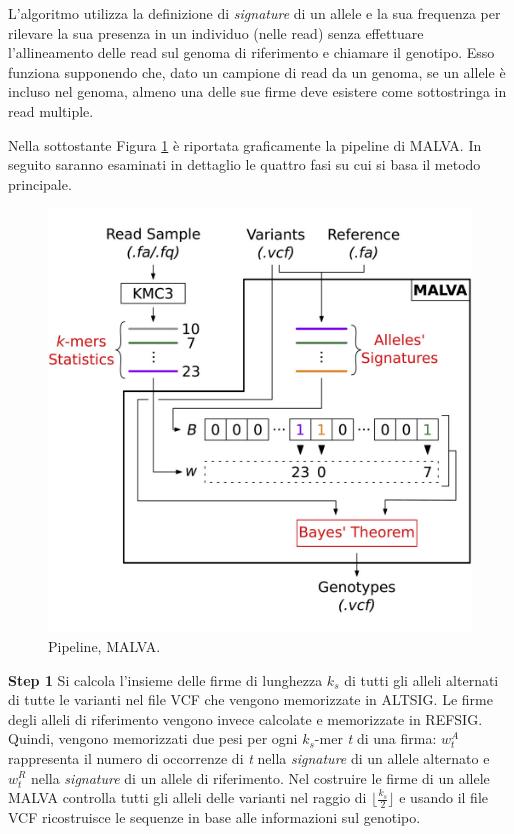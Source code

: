 \documentclass[../main.tex]{subfiles}
\begin{document}
L'algoritmo utilizza la definizione di \textit{signature} di un allele e la sua frequenza per rilevare la sua presenza in un individuo (nelle read) senza effettuare l'allineamento delle read sul genoma di riferimento e chiamare il genotipo. Esso funziona supponendo che, dato un campione di read da un genoma, se un allele è incluso nel genoma, almeno una delle sue firme deve esistere come sottostringa in read multiple. 

Nella sottostante Figura \ref{fig:malva} è riportata graficamente la pipeline di MALVA. In seguito saranno esaminati in dettaglio le quattro fasi su cui si basa il metodo principale.

 \begin{figure}[h!]
	\centering
  	\captionsetup{justification=centering}
 	\includegraphics[scale=.85]{images/malva-pipeline.jpg}
  	\caption{Pipeline, MALVA.}
  	\label{fig:malva}
\end{figure}

\noindent
\textbf{Step 1} Si calcola l'insieme delle firme di lunghezza \textit{${k}_{s}$} di tutti gli alleli alternati di tutte le varianti nel file VCF che vengono memorizzate in ALTSIG. Le firme degli alleli di riferimento vengono invece calcolate e memorizzate in REFSIG. Quindi, vengono memorizzati due pesi per ogni \textit{${k}_{s}$}-mer \textit{t} di una firma: \textit{$w_{t}^{A}$} rappresenta il numero di occorrenze di \textit{t} nella \textit{signature} di un allele alternato e \textit{$w_{t}^{R}$} nella \textit{signature} di un allele di riferimento. Nel costruire le firme di un allele MALVA controlla tutti gli alleli delle varianti nel raggio di $\lfloor \frac{ {{{k}_{s}} }}{2}  \rfloor$ e usando il file VCF ricostruisce le sequenze in base alle informazioni sul genotipo. 
\end{document}
